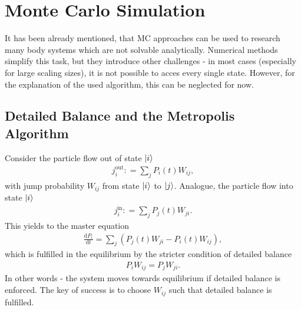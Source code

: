 \section{Monte Carlo Simulation}
It has been already mentioned, that MC approaches can be used to research many body systems which are not solvable analytically.
Numerical methods simplify this task, but they introduce other challenges - in most cases (especially for large scaling sizes), it is not possible to acces every single state.
However, for the explanation of the used algorithm, this can be neglected for now.

\subsection{Detailed Balance and the Metropolis Algorithm}
Consider the particle flow out of state $\ket{i}$
\begin{align}
	j^\text{out}_{i} \mathrel{\mathop:}= \sum_j P_i(t) W_{ij},
\end{align}
with jump probability $W_{ij}$ from state $\ket{i}$ to $\ket{j}$.
Analogue, the particle flow into state $\ket{i}$
\begin{align}
	j^\text{in}_{i} \mathrel{\mathop:}= \sum_j P_j(t) W_{ji}.
\end{align}
This yields to the master equation
\begin{align}
	\frac{\mathrm{d}P_i}{\mathrm{d}t} = 
		\sum_{j}\left(P_j(t)W_{ji} - P_i(t)W_{ij}\right),
\end{align}
which is fulfilled in the equilibrium by the stricter condition of detailed balance
\begin{align}
	P_iW_{ij} = P_jW_{ji}.
\end{align}
In other words - the system moves towards equilibrium if detailed balance is enforced.
The key of success is to choose $W_{ij}$ such that detailed balance is fulfilled.
